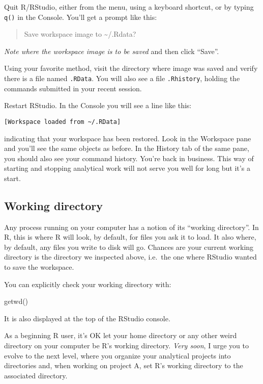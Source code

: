 \documentclass[
]{book}
\newenvironment{Shaded}{\begin{snugshade}}{\end{snugshade}}
\newcommand{\FunctionTok}[1]{\textcolor[rgb]{0.00,0.00,0.00}{#1}}
\newcommand{\NormalTok}[1]{#1}
\begin{document}
Quit R/RStudio, either from the menu, using a keyboard shortcut, or by typing \texttt{q()} in the Console. You'll get a prompt like this:

\begin{quote}
Save workspace image to \textasciitilde/.Rdata?
\end{quote}

\emph{Note where the workspace image is to be saved} and then click ``Save''.

Using your favorite method, visit the directory where image was saved and verify there is a file named \texttt{.RData}. You will also see a file \texttt{.Rhistory}, holding the commands submitted in your recent session.

Restart RStudio. In the Console you will see a line like this:

\begin{verbatim}
[Workspace loaded from ~/.RData]
\end{verbatim}

indicating that your workspace has been restored. Look in the Workspace pane and you'll see the same objects as before. In the History tab of the same pane, you should also see your command history. You're back in business. This way of starting and stopping analytical work will not serve you well for long but it's a start.

\hypertarget{working-directory}{%
\subsection{Working directory}\label{working-directory}}

Any process running on your computer has a notion of its ``working directory''. In R, this is where R will look, by default, for files you ask it to load. It also where, by default, any files you write to disk will go. Chances are your current working directory is the directory we inspected above, i.e.~the one where RStudio wanted to save the workspace.

You can explicitly check your working directory with:

\begin{Shaded}
\begin{Highlighting}[]
\FunctionTok{getwd}\NormalTok{()}
\end{Highlighting}
\end{Shaded}

It is also displayed at the top of the RStudio console.

As a beginning R user, it's OK let your home directory or any other weird directory on your computer be R's working directory. \emph{Very soon}, I urge you to evolve to the next level, where you organize your analytical projects into directories and, when working on project A, set R's working directory to the associated directory.
\end{document}
